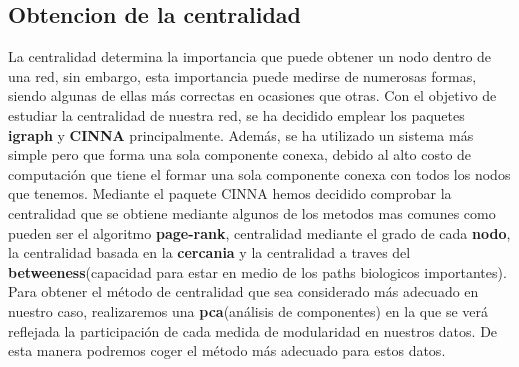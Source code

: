 \subsection{Obtencion de la centralidad}
La centralidad determina la importancia que puede obtener un nodo dentro de una red, sin embargo, esta importancia puede medirse de numerosas formas, siendo algunas de ellas m\'as correctas en ocasiones que otras.
Con el objetivo de estudiar la centralidad de nuestra red, se ha decidido emplear los paquetes \textbf{igraph} y \textbf{CINNA} principalmente. Adem\'as, se ha utilizado un sistema m\'as simple pero que forma una sola componente conexa, debido al alto costo de computaci\'on que tiene el formar una sola componente conexa con todos los nodos que tenemos.
Mediante el paquete CINNA hemos decidido comprobar la centralidad que se obtiene mediante algunos de los metodos mas comunes como pueden ser el algoritmo \textbf{page-rank}, centralidad mediante el grado de cada \textbf{nodo}, la centralidad basada en la \textbf{cercania} y la centralidad a traves del \textbf{betweeness}(capacidad para estar en medio de los paths biologicos importantes).
Para obtener el m\'etodo de centralidad que sea considerado m\'as adecuado en nuestro caso, realizaremos una \textbf{pca}(an\'alisis de componentes) en la que se ver\'a reflejada la participaci\'on de cada medida de modularidad en nuestros datos. De esta manera podremos coger el método más adecuado para estos datos.
